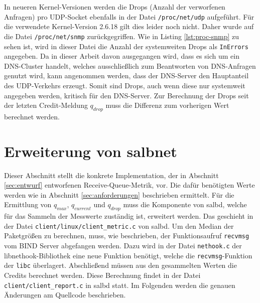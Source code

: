 \documentclass[a4paper, 12pt, BCOR10mm, DIV12, toc=bibliography, toc=listof, german]{scrbook}
\begin{document}
		In neueren Kernel-Versionen werden die Drops (Anzahl der verworfenen Anfragen) pro UDP-Socket
		ebenfalls in der Datei \texttt{/proc/net/udp} aufgeführt. Für die verwendete Kernel-Version
		2.6.18 gilt dies leider noch nicht. Daher wurde auf die Datei \texttt{/proc/net/snmp}
		zurückgegriffen. Wie in Listing \ref{lst:proc-snmp} zu sehen ist, wird in dieser Datei die Anzahl
		der systemweiten Drops als \texttt{InErrors} angegeben. Da in dieser Arbeit davon ausgegangen
		wird, dass es sich um ein DNS-Cluster handelt, welches ausschließlich zum Beantworten von
		DNS-Anfragen genutzt wird, kann angenommen werden, dass der DNS-Server den Hauptanteil
		des UDP-Verkehrs erzeugt. Somit sind Drops, auch wenn diese nur systemweit angegeben werden,
		kritisch für den DNS-Server. Zur Berechnung der Drops seit der letzten Credit-Meldung $q_{drop}$
		muss die Differenz zum vorherigen Wert berechnet werden.
		
		




		\section{Erweiterung von salbnet} %
		\label{sec:erweiterung}

		Dieser Abschnitt stellt die konkrete Implementation, der in Abschnitt \ref{sec:entwurf}
		entworfenen Receive-Queue-Metrik, vor. Die dafür benötigten Werte werden wie in Abschnitt
		\ref{sec:anforderungen} beschrieben ermittelt. Für die Ermittlung von $q_{max}$, $q_{current}$
		und $q_{drop}$ muss die Komponente von salbd, welche für das Sammeln der Messwerte zuständig
		ist, erweitert werden. Das geschieht in der Datei \texttt{client/linux/client\_metric.c} von
		salbd.  Um den Median der Paketgrößen zu berechnen, muss, wie beschrieben, der Funktionsaufruf
		\texttt{recvmsg} vom BIND Server abgefangen werden. Dazu wird in der Datei \texttt{nethook.c}
		der libnethook-Bibliothek eine neue Funktion benötigt, welche die \texttt{recvmsg}-Funktion der
		\texttt{libc} überlagert. Abschließend müssen aus den gesammelten Werten die Credits berechnet
		werden. Diese Berechnung findet in der Datei \texttt{client/client\_report.c} in salbd statt. Im
		Folgenden werden die genauen Änderungen am Quellcode beschrieben.
\end{document}
